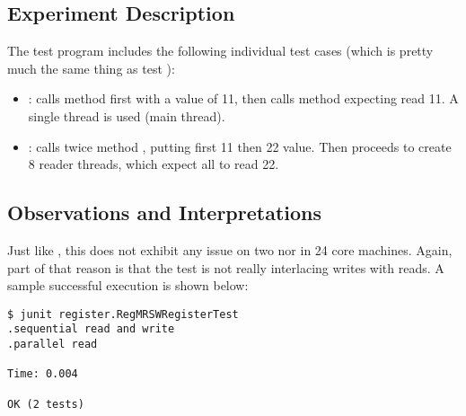 \subsection{Experiment Description}
The test program  includes the following individual
test cases (which is pretty much the same thing as test
):

\begin{itemize}
  \item {}: calls  method first with a value
    of 11, then calls  method expecting read 11. A single
    thread is used (main thread).
  \item {}: calls twice method , putting first
    11 then 22 value. Then proceeds to create 8 reader threads, which
    expect all to read 22. 
\end{itemize}

\subsection{Observations and Interpretations}
Just like , this does not exhibit any issue
on two nor in 24 core machines. Again, part of that reason is that the
test is not really interlacing writes with reads. A sample successful
execution is shown below: \\

\begin{verbatim}
$ junit register.RegMRSWRegisterTest
.sequential read and write
.parallel read

Time: 0.004

OK (2 tests)
\end{verbatim}
\hfill

